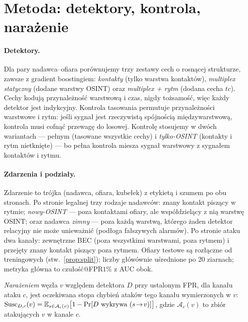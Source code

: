 \section{Metoda: detektory, kontrola, narażenie}
\label{sec:m-metoda}

\paragraph{Detektory.} Dla pary nadawca--ofiara porównujemy trzy
zestawy cech o rosnącej strukturze, zawsze z gradient boostingiem:
\emph{kontakty} (tylko warstwa kontaktów), \emph{multiplex
statyczny} (dodane warstwy OSINT) oraz \emph{multiplex + rytm}
(dodana cecha $tc$). Cechy kodują przynależność warstwową i czas,
nigdy tożsamość, więc każdy detektor jest indykcyjny. Kontrola
tasowania permutuje przynależności warstwowe i rytm: jeśli sygnał
jest rzeczywistą spójnością międzywarstwową, kontrola musi cofnąć
przewagę do losowej. Kontrolę stosujemy w dwóch wariantach ---
pełnym (tasowane wszystkie cechy) i \emph{tylko-OSINT} (kontakty
i rytm nietknięte) --- bo pełna kontrola miesza sygnał warstwowy
z sygnałem kontaktów i rytmu.

\paragraph{Zdarzenia i podziały.} Zdarzenie to trójka (nadawca,
ofiara, kubełek) z etykietą i szumem po obu stronach. Po stronie
legalnej trzy rodzaje nadawców: znany kontakt piszący w rytmie;
\emph{nowy-OSINT} --- poza kontaktami ofiary, ale współdzielący
z nią warstwę OSINT; oraz nadawca \emph{zimny} --- poza każdą
warstwą, którego żaden detektor relacyjny nie może unieważnić
(podłoga fałszywych alarmów). Po stronie ataku dwa kanały:
zewnętrzne BEC (poza wszystkimi warstwami, poza rytmem) i przejęty
znany kontakt piszący poza rytmem. Ofiary testowe są rozłączne od
treningowych (stw.~\ref{prop:split}); liczby główównie uśrednione
po 20 ziarnach; metryka główna to czułość@FPR$1\%$ z AUC obok.

\begin{definition}
\label{def:m-susc}
\emph{Narażeniem} węzła $v$ względem detektora $D$ przy ustalonym
FPR, dla kanału ataku $c$, jest oczekiwana stopa chybień ataków
tego kanału wymierzonych w $v$:
$\mathrm{Susc}_{D,c}(v)=\mathbb{E}_{s\in\mathcal{A}_c(v)}
\big[1-\Pr[D\ \text{wykrywa}\ (s\!\to\!v)]\big]$,
gdzie $\mathcal{A}_c(v)$ to zbiór atakujących $v$ w kanale $c$.
\end{definition}

